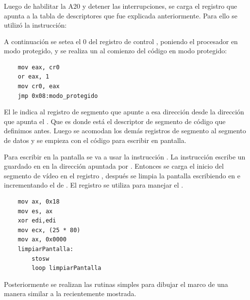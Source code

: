 \subsubsection{}
	Luego de habilitar la A20 y detener las interrupciones, se carga el registro  que apunta a la tabla de descriptores que fue explicada 
anteriormente. Para ello se utilizó la instrucción:

\vspace{2mm}
\vspace{2mm}

	A continuación se setea el  0 del registro de control , poniendo el procesador en modo protegido, y se realiza un  
al comienzo del código en modo protegido:

\begin{verbatim}
	mov eax, cr0
	or eax, 1
	mov cr0, eax
	jmp 0x08:modo_protegido
\end{verbatim}

\vspace{2mm}

	El  le indica al registro de segmento  que apunte a esa dirección desde la dirección que apunta el . Que es donde 
está el descriptor de segmento de código que definimos antes. Luego se acomodan los demás registros de segmento al segmento de datos y se empieza con 
el código para escribir en pantalla.

	Para escribir en la pantalla se va a usar la instrucción . La instrucción escribe un  guardado en  en la 
dirección apuntada por . Entonces se carga el inicio del segmento de vídeo en el registro , después se limpia la pantalla 
escribiendo  en  e incrementando el  de . El registro  se utiliza para manejar el .

\begin{verbatim}
	mov ax, 0x18
	mov es, ax
	xor edi,edi
	mov ecx, (25 * 80)
	mov ax, 0x0000
	limpiarPantalla:
		stosw	
		loop limpiarPantalla
\end{verbatim}

	Posteriormente se realizan las rutinas simples para dibujar el marco de una manera similar a la recientemente mostrada.

